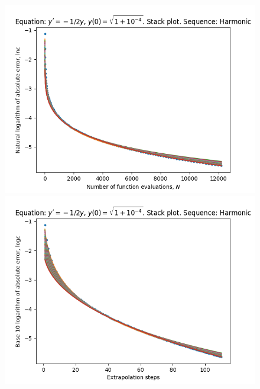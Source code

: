 \begin{figure}[H]
\centering
\begin{minipage}{0.45\textwidth}
\centering
\includegraphics[scale=0.45]{emr_plots/quad_sing_4_hp_harmonic_stack.png}
\end{minipage}
\begin{minipage}{0.45\textwidth}
\centering
\includegraphics[scale=0.45]{emr_plots/quad_sing_4_hp_harmonic_steps_stack.png}
\end{minipage}
\end{figure}

